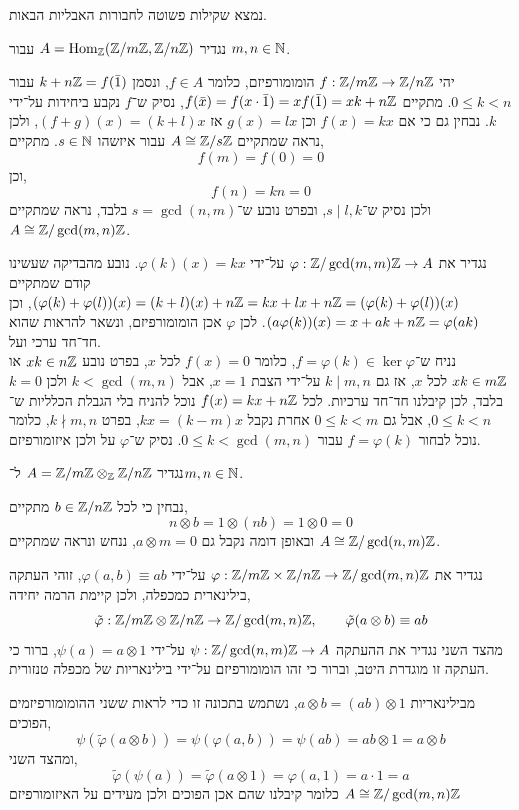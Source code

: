 \question{}
נמצא שקילות פשוטה לחבורות האבליות הבאות.

\subquestion{}
נגדיר $A = \operatorname{Hom}_{\mathbb{Z}}(\mathbb{Z} / m \mathbb{Z}, \mathbb{Z} / n \mathbb{Z})$ עבור $m, n \in \mathbb{N}$.
\begin{solution}
	יהי $f : \mathbb{Z} / m \mathbb{Z} \to \mathbb{Z} / n \mathbb{Z}$ הומומורפיזם, כלומר $f \in A$, ונסמן $k + n \mathbb{Z} = f(\bar{1})$ עבור $0 \le k < n$.
	מתקיים $f(\bar{x}) = f(x \cdot \bar{1}) = x f(\bar{1}) = x k + n \mathbb{Z}$, נסיק ש־$f$ נקבע ביחידות על־ידי $k$.
	נבחין גם כי אם $f(x) = k x$ וכן $g(x) = l x$ אז $(f + g)(x) = (k + l) x$, ולכן נראה שמתקיים $A \cong \mathbb{Z} / s \mathbb{Z}$ עבור איזשהו $s \in \mathbb{N}$.
	מתקיים,
	\[
		f(m)
		= f(0)
		= 0
	\]
	וכן,
	\[
		f(n)
		= k n
		= 0
	\]
	ולכן נסיק ש־$s \mid l, k$, ובפרט נובע ש־$s = \gcd(n, m)$ בלבד, נראה שמתקיים $A \cong \mathbb{Z} / \gcd(m, n) \mathbb{Z}$.

	נגדיר את $\varphi : \mathbb{Z} / \gcd(m, m) \mathbb{Z} \to A$ על־ידי $\varphi(k)(x) = k x$.
	נובע מהבדיקה שעשינו קודם שמתקיים $(\varphi(k) + \varphi(l))(x) = (k + l)(x) + n \mathbb{Z} = k x + l x + n \mathbb{Z} = (\varphi(k) + \varphi(l))(x)$, וכן $(a \varphi(k))(x) = x + a k + n \mathbb{Z} = \varphi(a k)$.
	לכן $\varphi$ אכן הומומורפיזם, ונשאר להראות שהוא חד־חד ערכי ועל. \\
	נניח ש־$f = \varphi(k) \in \ker \varphi$, כלומר $f(x) = 0$ לכל $x$, בפרט נובע $x k \in n \mathbb{Z}$ או $x k \in m \mathbb{Z}$ לכל $x$,
	אז גם $k \mid m, n$ על־ידי הצבת $x = 1$, אבל $k < \gcd(m, n)$ ולכן $k = 0$ בלבד, לכן קיבלנו חד־חד ערכיות.
	לכל $f(x) = k x + n \mathbb{Z}$ נוכל להניח בלי הגבלת הכלליות ש־$0 \le k < n$, אבל גם $0 \le k < m$ אחרת נקבל $k x = (k - m) x$, בפרט $k \nmid m, n$, כלומר נוכל לבחור $f = \varphi(k)$ עבור $0 \le k < \gcd(m, n)$.
	נסיק ש־$\varphi$ על ולכן איזומורפיזם.
\end{solution}

\subquestion{}
נגדיר $A = \mathbb{Z} / m \mathbb{Z} \otimes_{\mathbb{Z}} \mathbb{Z} / n \mathbb{Z}$ ל־$m, n \in \mathbb{N}$.
\begin{solution}
	נבחין כי לכל $b \in \mathbb{Z} / n \mathbb{Z}$ מתקיים,
	\[
		n \otimes b
		= 1 \otimes (n b)
		= 1 \otimes 0
		= 0
	\]
	ובאופן דומה נקבל גם $a \otimes m = 0$,
	ננחש ונראה שמתקיים $A \cong \mathbb{Z} / \gcd(n, m) \mathbb{Z}$.

	נגדיר את $\varphi : \mathbb{Z} / m \mathbb{Z} \times \mathbb{Z} / n \mathbb{Z} \to \mathbb{Z} / \gcd(m, n) \mathbb{Z}$ על־ידי $\varphi(a, b) \equiv a b$, זוהי העתקה בילינארית כמכפלה, ולכן קיימת הרמה יחידה,
	\[
		\tilde{\varphi} : \mathbb{Z} / m \mathbb{Z} \otimes \mathbb{Z} / n \mathbb{Z} \to \mathbb{Z} / \gcd(m, n) \mathbb{Z},
		\qquad
		\tilde{\varphi}(a \otimes b) \equiv a b
	\]
	מהצד השני נגדיר את ההעתקה $\psi : \mathbb{Z} / \gcd(n, m) \mathbb{Z} \to A$ על־ידי $\psi(a) = a \otimes 1$, ברור כי העתקה זו מוגדרת היטב, וברור כי זהו הומומורפיזם על־ידי בילינאריות של מכפלה טנזורית.

	מבילינאריות $a \otimes b = (a b) \otimes 1$,
	נשתמש בתכונה זו כדי לראות ששני ההומומורפיזמים הפוכים,
	\[
		\psi(\tilde{\varphi}(a \otimes b))
		= \psi(\varphi(a, b))
		= \psi(a b)
		= a b \otimes 1
		= a \otimes b
	\]
	ומהצד השני,
	\[
		\tilde{\varphi}(\psi(a))
		= \tilde{\varphi}(a \otimes 1)
		= \varphi(a, 1)
		= a \cdot 1
		= a
	\]
	כלומר קיבלנו שהם אכן הפוכים ולכן מעידים על האיזומורפיזם $A \cong \mathbb{Z} / \gcd(m, n) \mathbb{Z}$
\end{solution}

